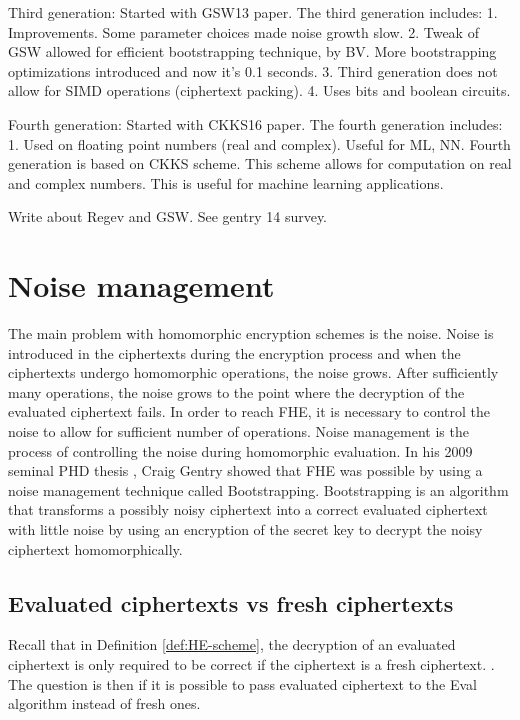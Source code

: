 Third generation:
Started with GSW13 paper. The third generation includes:
1. Improvements. Some parameter choices made noise growth slow.
2. Tweak of GSW allowed for efficient bootstrapping technique, by BV. More bootstrapping optimizations introduced and now it's 0.1 seconds.
3. Third generation does not allow for SIMD operations (ciphertext packing).
4. Uses bits and boolean circuits.

Fourth generation:
Started with CKKS16 paper. The fourth generation includes:
1. Used on floating point numbers (real and complex). Useful for ML, NN.
Fourth generation is based on CKKS scheme. This scheme allows for computation on real and complex numbers. This is useful for machine learning applications.

Write about Regev and GSW. See gentry 14 survey.



\section{Noise management}

The main problem with homomorphic encryption schemes is the noise. Noise is introduced in the ciphertexts during the encryption process and when the ciphertexts undergo homomorphic operations, the noise grows. After sufficiently many operations, the noise grows to the point where the decryption of the evaluated ciphertext fails. In order to reach FHE, it is necessary to control the noise to allow for sufficient number of operations. Noise management is the process of controlling the noise during homomorphic evaluation. In his 2009 seminal PHD thesis \cite{Gentry-Thesis}, Craig Gentry showed that FHE was possible by using a noise management technique called Bootstrapping. Bootstrapping is an algorithm that transforms a possibly noisy ciphertext into a correct evaluated ciphertext with little noise by using an encryption of the secret key to decrypt the noisy ciphertext homomorphically.

\subsection*{Evaluated ciphertexts vs fresh ciphertexts}
Recall that in Definition \ref{def:HE-scheme}, the decryption of an evaluated ciphertext is only required to be correct if the ciphertext is a fresh ciphertext. . The question is then if it is possible to pass evaluated ciphertext to the Eval algorithm instead of fresh ones.

